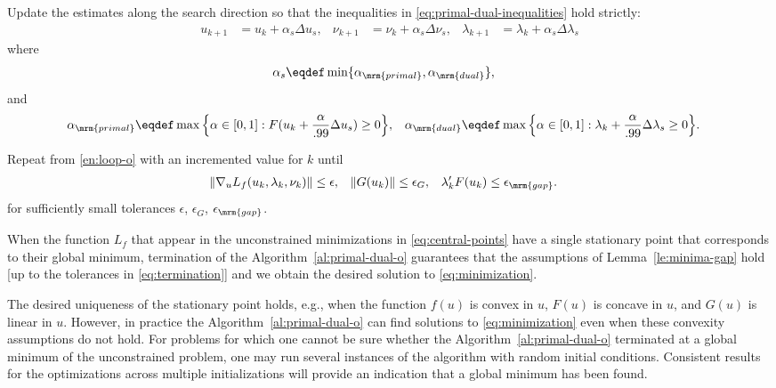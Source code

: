\documentclass[11pt]{article}
\begin{document}
\begin{algorithm}
\begin{steps}
\item Update the estimates along the search direction so that the
  inequalities in \eqref{eq:primal-dual-inequalities} hold
  strictly:
  \begin{align*}
    u_{k+1}&=u_k+\alpha_s\Delta u_s, &
    \nu_{k+1}&=\nu_k+\alpha_s \Delta \nu_s, &
    \lambda_{k+1}&=\lambda_k+\alpha_s \Delta \lambda_s
  \end{align*}
  where
  \begin{align*}
    \alpha_s&\eqdef\min\{\alpha_\mrm{primal},\alpha_\mrm{dual}\}, 
  \end{align*}
  and
  \begin{align}
    \alpha_\mrm{primal}&\eqdef \max\Big\{\alpha\in[0,1]:F(u_k+\frac{\alpha}{.99} \Delta u_s)\ge 0\Big\}, &
    \alpha_\mrm{dual}&\eqdef \max\Big\{\alpha\in[0,1]:\lambda_k+\frac{\alpha}{.99} \Delta\lambda_s\ge 0 \Big\}.
  \end{align}

\item Repeat from \ref{en:loop-o} with an incremented value for $k$ until
  \begin{align}\label{eq:termination}
    \|\nabla_u L_f(u_k,\lambda_k,\nu_k)\|&\le \epsilon, &
    \|G(u_k)\|&\le \epsilon_G, &
    \lambda_k 'F(u_k)&\le \epsilon_\mrm{gap}.
  \end{align}
  for sufficiently small tolerances $\epsilon$, $\epsilon_G$, $\epsilon_\mrm{gap}$. \frqed
\end{steps}
\end{algorithm}

When the function $L_f$ that appear in the unconstrained minimizations
in \eqref{eq:central-points} have a single stationary point that
corresponds to their global minimum, termination of the
Algorithm~\ref{al:primal-dual-o} guarantees that the assumptions of
Lemma~\ref{le:minima-gap} hold [up to the tolerances in
\eqref{eq:termination}] and we obtain the desired solution to
\eqref{eq:minimization}.

\medskip

The desired uniqueness of the stationary point holds, e.g., when the
function $f(u)$ is convex in $u$, $F(u)$ is concave in $u$, and $G(u)$
is linear in $u$. However, in practice the
Algorithm~\ref{al:primal-dual-o} can find solutions to
\eqref{eq:minimization} even when these convexity assumptions do not
hold. For problems for which one cannot be sure whether the
Algorithm~\ref{al:primal-dual-o} terminated at a global minimum of the
unconstrained problem, one may run several instances of the algorithm
with random initial conditions. Consistent results for the
optimizations across multiple initializations will provide an
indication that a global minimum has been found.
\end{document}

